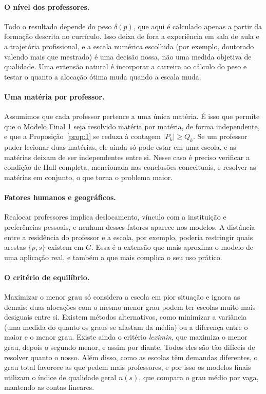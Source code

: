 \documentclass[12pt,a4paper]{article}
\begin{document}
\paragraph{O nível dos professores.} Todo o resultado depende do peso $\delta(p)$, que aqui é calculado apenas a partir da formação descrita no currículo. Isso deixa de fora a experiência em sala de aula e a trajetória profissional, e a escala numérica escolhida (por exemplo, doutorado valendo mais que mestrado) é uma decisão nossa, não uma medida objetiva de qualidade. Uma extensão natural é incorporar a carreira ao cálculo do peso e testar o quanto a alocação ótima muda quando a escala muda.

\paragraph{Uma matéria por professor.} Assumimos que cada professor pertence a uma única matéria. É isso que permite que o Modelo Final 1 seja resolvido matéria por matéria, de forma independente, e que a Proposição~\ref{prop:1} se reduza à contagem $|P_k| \ge Q_k$. Se um professor puder lecionar duas matérias, ele ainda só pode estar em uma escola, e as matérias deixam de ser independentes entre si. Nesse caso é preciso verificar a condição de Hall completa, mencionada nas conclusões conceituais, e resolver as matérias em conjunto, o que torna o problema maior.

\paragraph{Fatores humanos e geográficos.} Realocar professores implica deslocamento, vínculo com a instituição e preferências pessoais, e nenhum desses fatores aparece nos modelos. A distância entre a residência do professor e a escola, por exemplo, poderia restringir quais arestas $\{p, s\}$ existem em $G$. Essa é a extensão que mais aproxima o modelo de uma aplicação real, e também a que mais complica o seu uso prático.

\paragraph{O critério de equilíbrio.} Maximizar o menor grau só considera a escola em pior situação e ignora as demais: duas alocações com o mesmo menor grau podem ter escolas muito mais desiguais entre si. Existem métodos alternativos, como minimizar a variância (uma medida do quanto os graus se afastam da média) ou a diferença entre o maior e o menor grau. Existe ainda o critério \emph{leximin}, que maximiza o menor grau, depois o segundo menor, e assim por diante. Todos eles são tão difíceis de resolver quanto o nosso. Além disso, como as escolas têm demandas diferentes, o grau total favorece as que pedem mais professores, e por isso os modelos finais utilizam o índice de qualidade geral $n(s)$, que compara o grau médio por vaga, mantendo as contas lineares.
\end{document}
